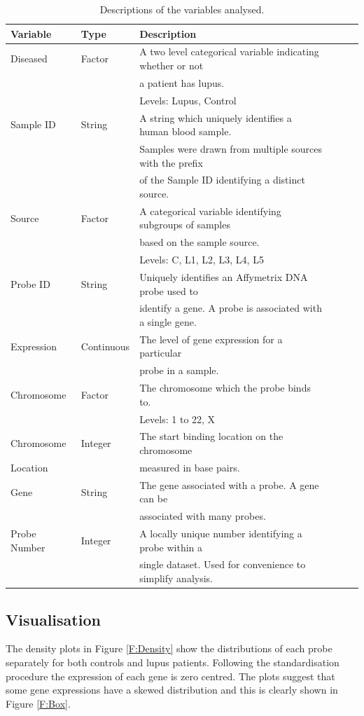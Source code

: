 \documentclass[a4paper, 12pt]{report}
\begin{document}
\begin{table}[ht]
\begin{centering}
\begin{tabular}{llllll}
  \hline
 Variable & Type & Description \\ 
  \hline
Diseased & Factor & A two level categorical variable indicating whether or not \\ 
  & & a patient has lupus.\\
&& Levels: Lupus, Control \\
Sample ID & String & A string which uniquely identifies a human blood sample. \\
 & & Samples were drawn from multiple sources with the prefix \\
&& of the Sample ID identifying a distinct source. \\ 
Source & Factor & A categorical variable identifying subgroups of samples \\
 & & based on the sample source. \\ 
&& Levels: C, L1, L2, L3, L4, L5 \\
Probe ID & String & Uniquely identifies an Affymetrix DNA probe used to \\
  && identify a gene. A probe is associated with a single gene. \\
Expression  & Continuous &  The level of gene expression for a particular \\
&& probe in a sample.\\ 
Chromosome & Factor &  The chromosome which the probe binds to. \\
&& Levels: 1 to 22, X\\
Chromosome & Integer &  The start binding location on the chromosome \\
Location && measured in base pairs. \\
Gene & String &  The gene associated with a probe. A gene can be \\
&& associated with many probes. \\
Probe Number & Integer & A locally unique number identifying a probe within a \\ 
&&single dataset. Used for convenience to simplify analysis.  \\
   \hline
\end{tabular}
\caption{Descriptions of the variables analysed.} 
\label{T:Data}
\end{centering}
\end{table}

\subsection*{Visualisation}
The density plots in Figure \ref{F:Density} show the distributions of each probe separately for both controls and lupus patients. Following the standardisation procedure the expression of each gene is zero centred. The plots suggest that some gene expressions have a skewed distribution and this is clearly shown in Figure \ref{F:Box}.
\end{document}
